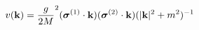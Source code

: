 \begin{equation}
v({\bf k}) = {\frac{g}{2M}}^{2} (\mbox{\boldmath $\sigma$}^{(1)} \cdot {\bf k})
(\mbox{\boldmath $\sigma$}^{(2)} \cdot {\bf k}) (|{\bf k}|^{2} + m^{2})^{-1} 
\end{equation}


